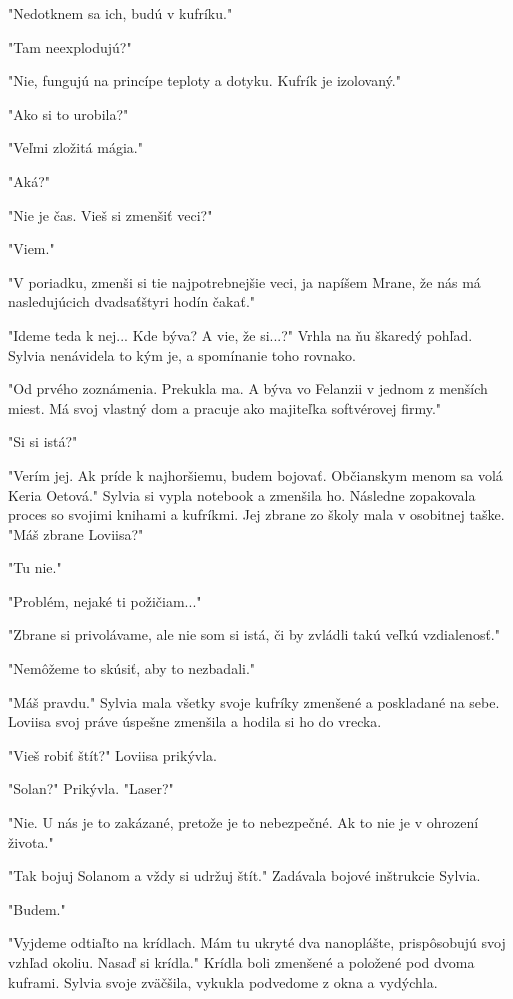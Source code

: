 \documentclass{book}
\begin{document}
"$ $Nedotknem sa ich, budú v kufríku."$ $ 

"$ $Tam neexplodujú?"$ $ 

"$ $Nie, fungujú na princípe teploty a dotyku. Kufrík je izolovaný."$ $ 

"$ $Ako si to urobila?"$ $ 

"$ $Veľmi zložitá mágia."$ $ 

"$ $Aká?"$ $ 

"$ $Nie je čas. Vieš si zmenšiť veci?"$ $ 

"$ $Viem."$ $ 

"$ $V poriadku, zmenši si tie najpotrebnejšie veci, ja napíšem Mrane, že nás má nasledujúcich dvadsaťštyri hodín čakať."$ $ 

"$ $Ideme teda k nej... Kde býva? A vie, že si...?"$ $  Vrhla na ňu škaredý pohľad. Sylvia nenávidela to kým je, a spomínanie toho rovnako.

"$ $Od prvého zoznámenia. Prekukla ma. A býva vo Felanzii v jednom z menších miest. Má svoj vlastný dom a pracuje ako majiteľka softvérovej firmy."$ $ 

"$ $Si si istá?"$ $ 

"$ $Verím jej. Ak príde k najhoršiemu, budem bojovať. Občianskym menom sa volá Keria Oetová."$ $  Sylvia si vypla notebook a zmenšila ho. Následne zopakovala proces so svojimi knihami a kufríkmi. Jej zbrane zo školy mala v osobitnej taške. "$ $Máš zbrane Loviisa?"$ $ 

"$ $Tu nie."$ $ 

"$ $Problém, nejaké ti požičiam..."$ $ 

"$ $Zbrane si privolávame, ale nie som si istá, či by zvládli takú veľkú vzdialenosť."$ $ 

"$ $Nemôžeme to skúsiť, aby to nezbadali."$ $ 

"$ $Máš pravdu."$ $  Sylvia mala všetky svoje kufríky zmenšené a poskladané na sebe. Loviisa svoj práve úspešne zmenšila a hodila si ho do vrecka.

"$ $Vieš robiť štít?"$ $  Loviisa prikývla.

"$ $Solan?"$ $  Prikývla. "$ $Laser?"$ $ 

"$ $Nie. U nás je to zakázané, pretože je to nebezpečné. Ak to nie je v ohrození života."$ $ 

"$ $Tak bojuj Solanom a vždy si udržuj štít."$ $  Zadávala bojové inštrukcie Sylvia.

"$ $Budem."$ $ 

"$ $Vyjdeme odtiaľto na krídlach. Mám tu ukryté dva nanoplášte, prispôsobujú svoj vzhľad okoliu. Nasaď si krídla."$ $  Krídla boli zmenšené a položené pod dvoma kuframi. Sylvia svoje zväčšila, vykukla podvedome z okna a vydýchla.
\end{document}
